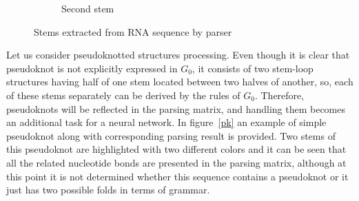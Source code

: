\begin{figure}[h]
{{\begin{subfigure}{.4\textwidth}
    \caption{Second stem}
    \label{stem2}
    \end{subfigure}%
  }\cr
}
\caption{Stems extracted from RNA sequence by parser}
\label{pars_res}
\end{figure}

Let us consider pseudoknotted structures processing. Even though it is clear that pseudoknot is not explicitly expressed in $G_0$, it consists of two stem-loop structures having half of one stem located between two halves of another, so, each of these stems separately can be derived by the rules of $G_0$. Therefore, pseudoknots will be reflected in the parsing matrix, and handling them becomes an additional task for a neural network. In figure~\ref{pk} an example of simple pseudoknot along with corresponding parsing result is provided. Two stems of this pseudoknot are highlighted with two different colors and it can be seen that all the related nucleotide bonds are presented in the parsing matrix, although at this point it is not determined whether this sequence contains a pseudoknot or it just has two possible folds in terms of grammar.

